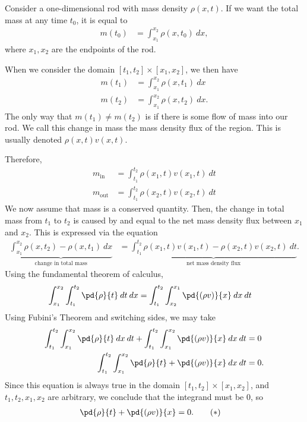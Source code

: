 \documentclass[10pt]{mypackage}
\begin{document}
\begin{example}
Consider a one-dimensional rod with mass density $\rho\left( x,t \right)$. If we want the total mass at any time $t_0$, it is equal to
\begin{align*}
  m\left( t_0 \right) &= \int_{x_1}^{x_2} \rho\left( x,t_0 \right)\:dx,
\end{align*}
where $x_1,x_2$ are the endpoints of the rod.\newline

When we consider the domain $\left[ t_1,t_2 \right]\times \left[ x_1,x_2 \right]$, we then have
\begin{align*}
  m\left(t_1 \right) &= \int_{x_1}^{x_2} \rho\left( x,t_1 \right)\:dx\\
  m\left( t_2 \right) &= \int_{x_1}^{x_2} \rho\left( x,t_2 \right)\:dx.
\end{align*}
The only way that $m\left( t_1 \right)\neq m\left( t_2 \right)$ is if there is some flow of mass into our rod. We call this change in mass the mass density flux of the region. This is usually denoted $\rho\left( x,t \right)v\left( x,t \right)$.\newline

Therefore,
\begin{align*}
  m_{\text{in}} &= \int_{t_1}^{t_2} \rho\left( x_1,t \right)v\left( x_1,t \right)\:dt\\
  m_{\text{out}} &= \int_{t_1}^{t_2} \rho\left( x_2,t \right)v\left( x_2,t \right)\:dt
\end{align*}
We now assume that mass is a conserved quantity. Then, the change in total mass from $t_1$ to $t_2$ is caused by and equal to the net mass density flux between $x_1$ and $x_2$. This is expressed via the equation
\begin{align*}
  \underbrace{\int_{x_1}^{x_2} \rho\left( x,t_2 \right)-\rho\left( x,t_1 \right)\:dx}_{\text{change in total mass}} &= \underbrace{\int_{t_1}^{t_2} \rho\left( x_1,t \right)v\left( x_1,t \right)-\rho\left( x_2,t \right)v\left( x_2,t \right)\:dt}_{\text{net mass density flux}}.
\end{align*}
Using the fundamental theorem of calculus,
\begin{align*}
  \int_{x_1}^{x_2} \int_{t_1}^{t_2} \pd{\rho}{t}\:dt\:dx &= \int_{t_1}^{t_2} \int_{x_2}^{x_1} \pd{(\rho v)}{x}\:dx\:dt
\end{align*}
Using Fubini's Theorem and switching sides, we may take
\begin{align*}
  \int_{t_1}^{t_2} \int_{x_1}^{x_2} \pd{\rho}{t}\:dx\:dt + \int_{t_1}^{t_2} \int_{x_1}^{x_2} \pd{(\rho v)}{x}\:dx\:dt &= 0\\
  \int_{t_1}^{t_2} \int_{x_1}^{x_2} \pd{\rho}{t} + \pd{(\rho v)}{x}\:dx\:dt &= 0.
\end{align*}
Since this equation is always true in the domain $\left[ t_1,t_2 \right]\times \left[ x_1,x_2 \right]$, and $t_1,t_2,x_1,x_2$ are arbitrary, we conclude that the integrand must be $0$, so
\begin{align*}
  \pd{\rho}{t} + \pd{(\rho v)}{x} &= 0.\label{eq:conservation_of_mass}\tag{$\ast$}
\end{align*}
\end{example}
\end{document}
